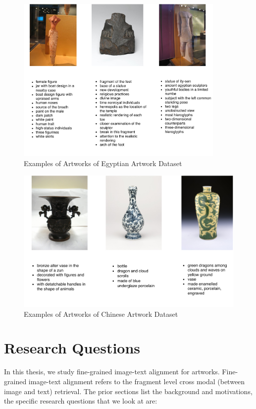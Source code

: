 \begin{figure}[h!]
\centering
\includegraphics[width=0.9\textwidth]{egyptian.pdf}
\caption{Examples of Artworks of Egyptian Artwork Dataset}
\label{fig:sampleEgyptian}
\end{figure}

\begin{figure}[h!]
\centering
\includegraphics[width=\textwidth]{chinese.pdf}
\caption{Examples of Artworks of Chinese Artwork Dataset}
\label{fig:sampleChinese}
\end{figure}

\section{Research Questions}

In this thesis, we study fine-grained image-text alignment for artworks. Fine-grained image-text alignment refers to the fragment level cross modal (between image and text) retrieval. The prior sections list the background and motivations, the specific research questions that we look at are:

